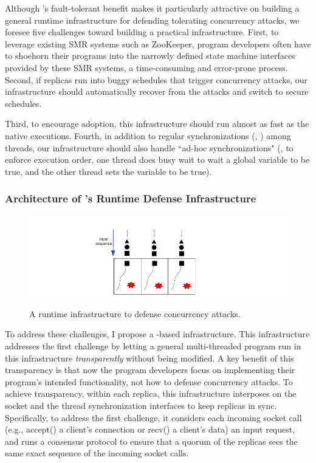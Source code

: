 Although \smr's fault-tolerant benefit makes it particularly attractive
on building a general runtime infrastructure for defending tolerating 
concurrency attacks, we foresee five challenges toward building a practical 
infrastructure. First, to leverage existing SMR systems such as ZooKeeper, 
program developers often have to shoehorn their programs into the 
narrowly defined state machine interfaces provided by these SMR systems, a 
time-consuming and error-prone process. Second, if replicas run into buggy 
schedules that trigger concurrency attacks, our infrastructure should 
automatically recover from the attacks and switch to secure schedules.

Third, to encourage adoption, this infrastructure should run almost as fast as 
the native executions. Fourth, in addition to regular synchronizations (\eg, 
\mutexlock) among threads, our infrastructure should also handle ``ad-hoc 
synchronizations" (\eg, to enforce execution order, one thread does busy wait to 
wait a global variable to be true, and the other thread sets the variable to be 
true).

\vspace{-.15in}\subsubsection{Architecture of \xxx's Runtime Defense 
Infrastructure} 
\label{sec:defense-arch}\vspace{-.075in}

\begin{figure}[ht]
\centering
\includegraphics[width=0.3\columnwidth]{figures/defense}
\vspace{-.05in}
\caption{{A runtime infrastructure to defense concurrency attacks.}} 
\label{fig:defense}
\vspace{-.05in}
\end{figure}

To address these challenges, I propose a \smr-based 
infrastructure. This infrastructure addresses the first challenge by letting a 
general multi-threaded program run in this infrastructure \emph{transparently} 
without being modified. A key benefit of this transparency is that now the 
program developers focus on implementing their program's intended 
functionality, not how to defense concurrency attacks. To achieve transparency, 
within each \smr replica, this infrastructure interposes on the socket and the 
thread synchronization interfaces to keep replicas in sync. Specifically, to 
address the first challenge, it considers each incoming socket call (e.g., 
accept() a client's connection or recv() a client's data) an input request, and 
runs a \paxos consensus protocol to ensure that a quorum of the replicas sees 
the same exact sequence of the incoming socket calls.


